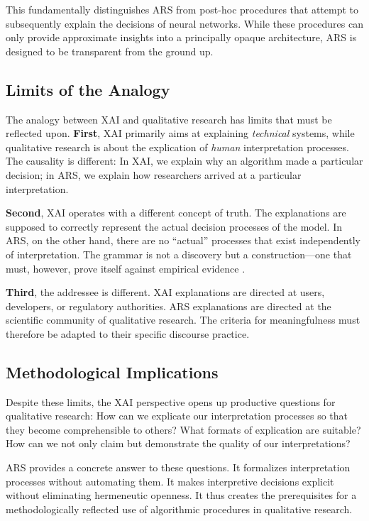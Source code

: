 \documentclass[
  12pt,
  a4paper,
  oneside,
  titlepage
]{article}
\begin{document}
This fundamentally distinguishes ARS from post-hoc procedures that attempt to 
subsequently explain the decisions of neural networks. While these procedures can 
only provide approximate insights into a principally opaque architecture, ARS is 
designed to be transparent from the ground up.

\subsection{Limits of the Analogy}

The analogy between XAI and qualitative research has limits that must be reflected 
upon. \textbf{First}, XAI primarily aims at explaining \textit{technical} systems, 
while qualitative research is about the explication of \textit{human} interpretation 
processes. The causality is different: In XAI, we explain why an algorithm made a 
particular decision; in ARS, we explain how researchers arrived at a particular 
interpretation.

\textbf{Second}, XAI operates with a different concept of truth. The explanations 
are supposed to correctly represent the actual decision processes of the model. In 
ARS, on the other hand, there are no \enquote{actual} processes that exist 
independently of interpretation. The grammar is not a discovery but a construction—one 
that must, however, prove itself against empirical evidence \citep[ p.~80]{Flick2019}.

\textbf{Third}, the addressee is different. XAI explanations are directed at users, 
developers, or regulatory authorities. ARS explanations are directed at the 
scientific community of qualitative research. The criteria for meaningfulness must 
therefore be adapted to their specific discourse practice.

\subsection{Methodological Implications}

Despite these limits, the XAI perspective opens up productive questions for 
qualitative research: How can we explicate our interpretation processes so that 
they become comprehensible to others? What formats of explication are suitable? 
How can we not only claim but demonstrate the quality of our interpretations?

ARS provides a concrete answer to these questions. It formalizes interpretation 
processes without automating them. It makes interpretive decisions explicit without 
eliminating hermeneutic openness. It thus creates the prerequisites for a 
methodologically reflected use of algorithmic procedures in qualitative research.
\end{document}
